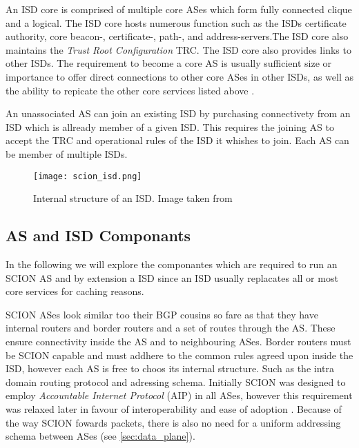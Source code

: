 \documentclass[../eva1_scion.tex]{subfiles}
\begin{document}
    An ISD core is comprised of multiple core ASes which form fully connected clique and a logical. The ISD core hosts numerous function such as the ISDs certificate authority, core beacon-, certificate-, path-, and address-servers.The ISD core also maintains the \textit{Trust Root Configuration} TRC. The ISD core also provides links to other ISDs. The requirement to become a core AS is usually sufficient size or importance to offer direct connections to other core ASes in other ISDs, as well as the ability to repicate the other core services listed above \cite{scion_2011}.

    An unassociated AS can join an existing ISD by purchasing connectivety from an ISD which is allready member of a given ISD. This requires the joining AS to accept the TRC and operational rules of the ISD it whishes to join. Each AS can be member of multiple ISDs.

    \begin{figure}[ht]
        \centering
        \texttt{[image: scion\_isd.png]}
        \caption{Internal structure of an ISD. Image taken from \cite{scion_2017}}%
        \label{fig:isd}
    \end{figure}

    \subsection{AS and ISD Componants}

    In the following we will explore the componantes which are required to run an SCION AS and by extension a ISD since an ISD usually replacates all or most core services for caching reasons.

    SCION ASes look similar too their BGP cousins so fare as that they have internal routers and border routers and a set of routes through the AS. These ensure connectivity inside the AS and to neighbouring ASes. Border routers must be SCION capable and must addhere to the common rules agreed upon inside the ISD, however each AS is free to choos its internal structure. Such as the intra domain routing protocol and adressing schema. Initially SCION was designed to employ \textit{Accountable Internet Protocol} (AIP) \cite{scion_2011, aip_2008} in all ASes, however this requirement was relaxed later in favour of interoperability and ease of adoption \cite{scion_2015}. Because of the way SCION fowards packets, there is also no need for a uniform addressing schema between ASes (see \ref{sec:data_plane}).
\end{document}
